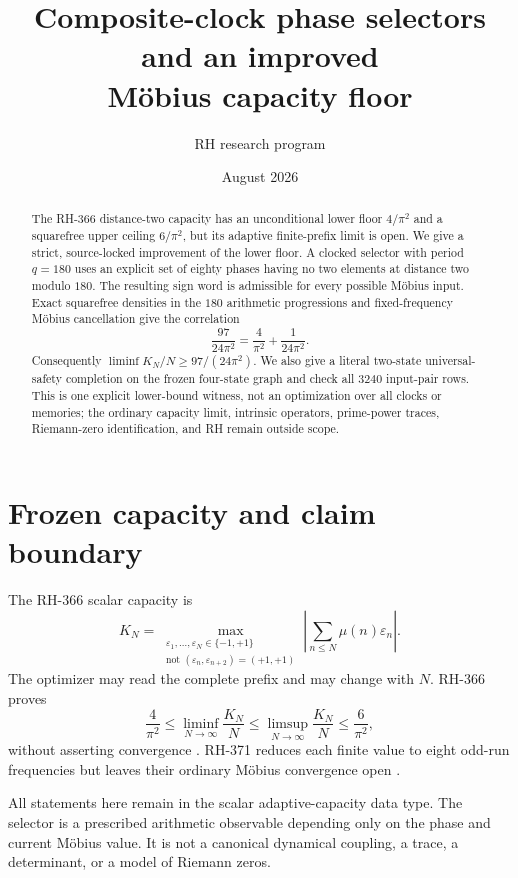 \documentclass[11pt]{article}
\title{Composite-clock phase selectors and an improved\\
M\"obius capacity floor}
\author{RH research program}
\date{August 2026}
\theoremstyle{definition}
\theoremstyle{remark}
\newcommand{\Mob}{\mu}
\newcommand{\eps}{\varepsilon}
\begin{document}
\maketitle

\begin{abstract}
The RH-366 distance-two capacity has an unconditional lower floor
$4/\pi^2$ and a squarefree upper ceiling $6/\pi^2$, but its adaptive
finite-prefix limit is open.  We give a strict, source-locked improvement of
the lower floor.  A clocked selector with period $q=180$ uses an explicit set
of eighty phases having no two elements at distance two modulo $180$.  The
resulting sign word is admissible for every possible M\"obius input.  Exact
squarefree densities in the $180$ arithmetic progressions and fixed-frequency
M\"obius cancellation give the correlation
\[
       \frac{97}{24\pi^2}
       =\frac4{\pi^2}+\frac1{24\pi^2}.
\]
Consequently $\liminf K_N/N\ge97/(24\pi^2)$.  We also give a literal
two-state universal-safety completion on the frozen four-state graph and
check all $3240$ input-pair rows.  This is one explicit lower-bound witness,
not an optimization over all clocks or memories; the ordinary capacity limit,
intrinsic operators, prime-power traces, Riemann-zero identification, and RH
remain outside scope.
\end{abstract}

\section{Frozen capacity and claim boundary}

The RH-366 scalar capacity is
\begin{equation}
 K_N=\max_{\substack{\eps_1,\ldots,\eps_N\in\{-1,+1\}\\
 \text{not }(\eps_n,\eps_{n+2})=(+1,+1)}}
 \left|\sum_{n\le N}\Mob(n)\eps_n\right|.
 \label{eq:capacity}
\end{equation}
The optimizer may read the complete prefix and may change with $N$.  RH-366
proves
\begin{equation}
 \frac4{\pi^2}\le\liminf_{N\to\infty}\frac{K_N}{N}
 \le\limsup_{N\to\infty}\frac{K_N}{N}\le\frac6{\pi^2},
 \label{eq:old-bracket}
\end{equation}
without asserting convergence \cite{RH366}.  RH-371 reduces each finite value
to eight odd-run frequencies but leaves their ordinary M\"obius convergence
open \cite{RH371}.

All statements here remain in the scalar adaptive-capacity data type.  The
selector is a prescribed arithmetic observable depending only on the phase
and current M\"obius value.  It is not a canonical dynamical coupling, a
trace, a determinant, or a model of Riemann zeros.
\end{document}
